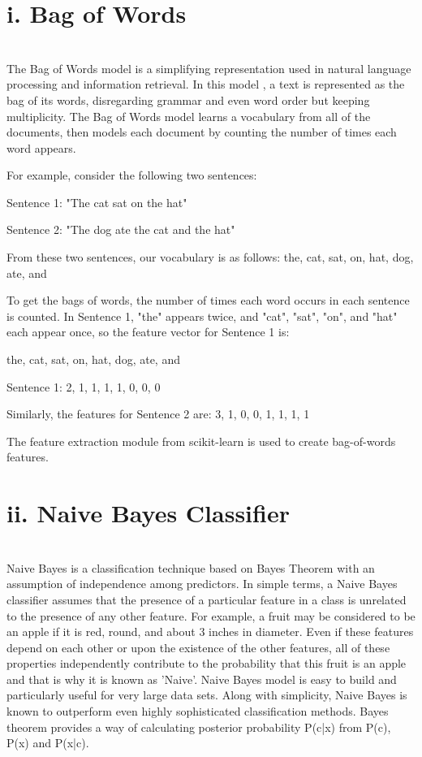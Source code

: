 \chapter{\textbf{i. Bag of Words}} \\
The Bag of Words model is a simplifying representation used in natural language processing and information retrieval. In this model , a text is represented as the bag of its words, disregarding grammar and even word order but keeping multiplicity. The Bag of Words model learns a vocabulary from all of the documents, then models each document by counting the number of times each word appears. 

For example, consider the following two sentences:

Sentence 1: "The cat sat on the hat"

Sentence 2: "The dog ate the cat and the hat"

From these two sentences, our vocabulary is as follows:
{ the, cat, sat, on, hat, dog, ate, and }

To get the bags of words, the number of times each word occurs in each sentence is counted. In Sentence 1, "the" appears twice, and "cat", "sat", "on", and "hat" each appear once, so the feature vector for Sentence 1 is: 

{ the, cat, sat, on, hat, dog, ate, and }

Sentence 1: { 2, 1, 1, 1, 1, 0, 0, 0 }

Similarly, the features for Sentence 2 are: { 3, 1, 0, 0, 1, 1, 1, 1}

The feature extraction module from scikit-learn is used to create bag-of-words features.

\chapter{\textbf{ii. Naive Bayes Classifier}}\\
\cite{nbb} Naive Bayes is a classification technique based on Bayes Theorem with an assumption of independence among predictors. In simple terms, a Naive Bayes classifier assumes that the presence of a particular feature in a class is unrelated to the presence of any other feature. For example, a fruit may be considered to be an apple if it is red, round, and about 3 inches in diameter. Even if these features depend on each other or upon the existence of the other features, all of these properties independently contribute to the probability that this fruit is an apple and that is why it is known as 'Naive'.
Naive Bayes model is easy to build and particularly useful for very large data sets. Along with simplicity, Naive Bayes is known to outperform even highly sophisticated classification methods.
Bayes theorem provides a way of calculating posterior probability P(c|x) from P(c), P(x) and P(x|c).


